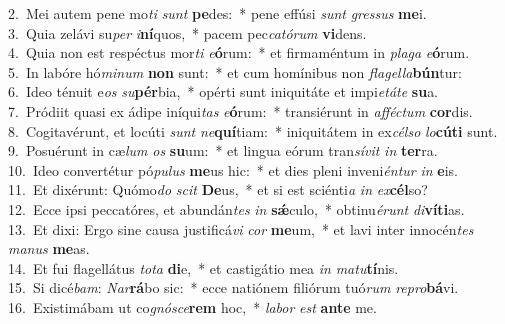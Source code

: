 {2.~}Mei autem pene mo\textit{ti} \textit{sunt} \textbf{pe}des:~* pene effúsi \textit{sunt} \textit{gres}\textit{sus} \textbf{me}i.\\
{3.~}Quia zelávi su\textit{per} \textit{i}\textbf{ní}quos,~* pacem pec\textit{ca}\textit{tó}\textit{rum} \textbf{vi}dens.\\
{4.~}Quia non est respéctus mor\textit{ti} \textit{e}\textbf{ó}rum:~* et firmaméntum in \textit{pla}\textit{ga} \textit{e}\textbf{ó}rum.\\
{5.~}In labóre hó\textit{mi}\textit{num} \textbf{non} sunt:~* et cum homínibus non \textit{fla}\textit{gel}\textit{la}\textbf{bún}tur:\\
{6.~}Ideo ténuit e\textit{os} \textit{su}\textbf{pér}bia,~* opérti sunt iniquitáte et impi\textit{e}\textit{tá}\textit{te} \textbf{su}a.\\
{7.~}Pródiit quasi ex ádipe iníqui\textit{tas} \textit{e}\textbf{ó}rum:~* transiérunt in \textit{af}\textit{fé}\textit{ctum} \textbf{cor}dis.\\
{8.~}Cogitavérunt, et locúti \textit{sunt} \textit{ne}\textbf{quí}tiam:~* iniquitátem in ex\textit{cél}\textit{so} \textit{lo}\textbf{cú}\textbf{ti} sunt.\\
{9.~}Posuérunt in cæ\textit{lum} \textit{os} \textbf{su}um:~* et lingua eórum tran\textit{sí}\textit{vit} \textit{in} \textbf{ter}ra.\\
{10.~}Ideo convertétur pó\textit{pu}\textit{lus} \textbf{me}us hic:~* et dies pleni inveni\textit{én}\textit{tur} \textit{in} \textbf{e}is.\\
{11.~}Et dixérunt: Quómo\textit{do} \textit{scit} \textbf{De}us,~* et si est sciénti\textit{a} \textit{in} \textit{ex}\textbf{cél}so?\\
{12.~}Ecce ipsi peccatóres, et abundán\textit{tes} \textit{in} \textbf{sǽ}culo,~* obtinu\textit{é}\textit{runt} \textit{di}\textbf{ví}\textbf{ti}as.\\
{13.~}Et dixi: Ergo sine causa justificá\textit{vi} \textit{cor} \textbf{me}um,~* et lavi inter innocén\textit{tes} \textit{ma}\textit{nus} \textbf{me}as.\\
{14.~}Et fui flagellátus \textit{to}\textit{ta} \textbf{di}e,~* et castigátio mea \textit{in} \textit{ma}\textit{tu}\textbf{tí}nis.\\
{15.~}Si dicé\textit{bam}: \textit{Nar}\textbf{rá}bo sic:~* ecce natiónem filiórum tuó\textit{rum} \textit{re}\textit{pro}\textbf{bá}vi.\\
{16.~}Existimábam ut co\textit{gnó}\textit{sce}\textbf{rem} hoc,~* \textit{la}\textit{bor} \textit{est} \textbf{an}\textbf{te} me.\\
